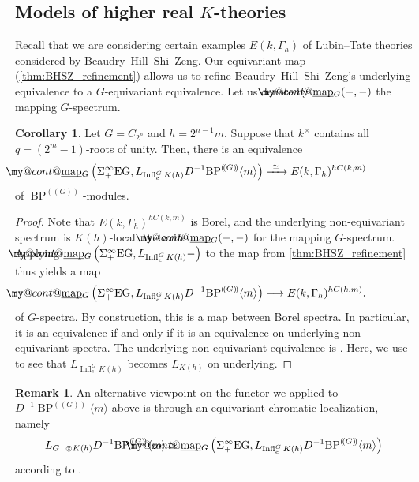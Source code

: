 \documentclass[a4paper, 10pt]{article}
\makeatletter
\newcommand{\BPG}{{\BP^{(\!(G)\!)}}}
\newcommand{\BPGm}{{\BP^{(\!(G)\!)}}\langle m\rangle}
\newcommand{\BP}{\operatorname{BP}}
\newcommand{\map}{\operatorname{map}}
\newcommand{\Infl}{\operatorname{Infl}}
\DeclareRobustCommand{\myuline}[2][0pt]{%
  \ifmmode
    \uline{\hphantom{#2}\kern-#1}%
    \kern#1%
    \mathllap{\mathpalette\my@cont@{#2}}%
  \else
    \uline{\phantom{#2}\kern-#1}%
    \kern#1%
    \llap{\contour{white}{#2}}%
  \fi
}
\newcommand{\ul}{\myuline}
\newcommand{\my@cont@}[2]{\contour{white}{\mbox{$\m@th#1#2$}}}
\theoremstyle{definition}
\newtheorem{remark}[remark]{Remark}
\newtheorem{corollary}[corollary]{Corollary}
\makeatother
\begin{document}
\subsection{Models of higher real $K$-theories}

Recall that we are considering certain examples $E(k, \Gamma_h)$ of Lubin--Tate theories considered by Beaudry--Hill--Shi--Zeng. Our equivariant map (\cref{thm:BHSZ_refinement}) allows us to refine Beaudry--Hill--Shi--Zeng's underlying equivalence to a \(G\)-equivariant equivalence. Let us denote by $\ul{\map}_G(-,-)$ the mapping $G$-spectrum. 

\begin{corollary}\label{cor:BPGmEh_equivalence}
    Let $G = C_{2^n}$ and $h = 2^{n-1}m$. Suppose that $k^{\times}$ contains all $q = (2^m-1)$-roots of unity. Then, there is an equivalence
    \[ \ul{\map}_G \left(\Sigma_+^{\infty} \mathrm{EG}, L_{\Infl_e^G K(h)} D^{-1}\BPGm \right) \xrightarrow{\ \simeq \ } E(k,\Gamma_h)^{hC(k,m)} \]
    of $\BPG$-modules.
\end{corollary}
\begin{proof}
    Note that \(E(k,\Gamma_h)^{hC(k,m)}\) is Borel, and the underlying non-equivariant spectrum is \(K(h)\)-local.
    We write $\ul{\map}_G(-,-)$ for the mapping $G$-spectrum. Applying $\ul{\map}_G \left(\Sigma_+^{\infty} \mathrm{EG}, L_{\Infl_e^G K(h)}- \right)$ to the map from \cref{thm:BHSZ_refinement} thus yields a map
    \[
    \ul{\map}_G \left(\Sigma_+^{\infty} \mathrm{EG}, L_{\Infl_e^G K(h)} D^{-1}\BPGm \right) \longrightarrow E(k,\Gamma_h)^{hC(k,m)}.
    \]
    of $G$-spectra. By construction, this is a map between Borel 
    spectra. In particular, it is an equivalence if and only if it is an equivalence on underlying non-equivariant spectra.
    The underlying non-equivariant equivalence is \cite[Proposition 7.6]{beaudryHillShiZeng2021modelsLubinTate}. Here, we use \cite[Proposition 3.2(2)]{carrickSmashingLocalizationsEquivariant2022} to see that $L_{\Infl_e^G K(h)}$ becomes $L_{K(h)}$ on underlying.
\end{proof}

\begin{remark}
    An alternative viewpoint on the functor we applied to $D^{-1} \BPGm$ above is through an equivariant chromatic localization, namely
    \[  L_{G_+\otimes K(h)}D^{-1}\BPGm \simeq \ul{\map}_G \left(\Sigma_+^{\infty} \mathrm{EG}, L_{\Infl_e^G K(h)} D^{-1}\BPGm \right) \]
    according to \cite[Proposition 3.21]{carrickSmashingLocalizationsEquivariant2022}.
\end{remark}
\end{document}
